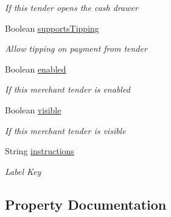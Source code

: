 \begin{DoxyCompactItemize}
\begin{DoxyCompactList}\small\item\em If this tender opens the cash drawer \end{DoxyCompactList}\item 
Boolean \hyperlink{classcom_1_1clover_1_1sdk_1_1v3_1_1base___1_1_tender_a908bac8871d58d1cc29f5ca1c8a022cc}{supports\+Tipping}
\begin{DoxyCompactList}\small\item\em Allow tipping on payment from tender \end{DoxyCompactList}\item 
Boolean \hyperlink{classcom_1_1clover_1_1sdk_1_1v3_1_1base___1_1_tender_a2fc29dbf52846a2d7e2e79fddc178fb3}{enabled}
\begin{DoxyCompactList}\small\item\em If this merchant tender is enabled \end{DoxyCompactList}\item 
Boolean \hyperlink{classcom_1_1clover_1_1sdk_1_1v3_1_1base___1_1_tender_ad1d373010d994888c0fda0e9b4a1f206}{visible}
\begin{DoxyCompactList}\small\item\em If this merchant tender is visible \end{DoxyCompactList}\item 
String \hyperlink{classcom_1_1clover_1_1sdk_1_1v3_1_1base___1_1_tender_a4d7b9fbb6b98db7a35e046179abc4f1a}{instructions}
\begin{DoxyCompactList}\small\item\em Label Key \end{DoxyCompactList}\end{DoxyCompactItemize}


\subsection{Property Documentation}
\mbox{\label{classcom_1_1clover_1_1sdk_1_1v3_1_1base___1_1_tender_a1a267d95c2d3bbf07caa8b6aaa30eb7c}} 
